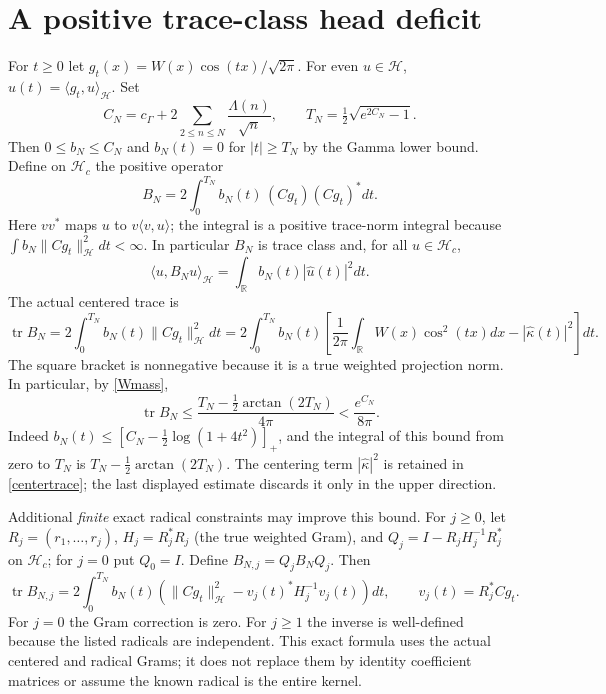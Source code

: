 \documentclass[11pt]{article}
\newcommand{\R}{\mathbb R}\newcommand{\Hh}{\mathcal H}\newcommand{\Nn}{\mathcal N}\newcommand{\norm}[1]{\lVert#1\rVert}\newcommand{\ip}[2]{\langle #1,#2\rangle}\newcommand{\dom}{\operatorname{Dom}}
\begin{document}
\section{A positive trace-class head deficit}\label{trace}
For $t\ge0$ let $g_t(x)=W(x)\cos(tx)/\sqrt{2\pi}$. For even $u\in\Hh$, $\widehat u(t)=\ip{g_t}{u}_{\Hh}$. Set
\begin{equation}\label{CN}
 C_N=c_\Gamma+2\sum_{2\le n\le N}\frac{\Lambda(n)}{\sqrt n},\qquad
 T_N=\tfrac12\sqrt{e^{2C_N}-1}.
\end{equation}
Then $0\le b_N\le C_N$ and $b_N(t)=0$ for $|t|\ge T_N$ by the Gamma lower bound. Define on $\Hh_c$ the positive operator
\begin{equation}\label{Bdef}
 B_N=2\int_0^{T_N} b_N(t)\,(Cg_t)(Cg_t)^*dt.
\end{equation}
Here $v v^*$ maps $u$ to $v\ip{v}{u}$; the integral is a positive trace-norm integral because
$\int b_N\norm{Cg_t}_{\Hh}^2dt<\infty$. In particular $B_N$ is trace class and, for all $u\in\Hh_c$,
\begin{equation}\label{Bform}
 \ip{u}{B_Nu}_{\Hh}=\int_\R b_N(t)|\widehat u(t)|^2dt.
\end{equation}
The actual centered trace is
\begin{equation}\label{centertrace}
 \operatorname{tr}B_N=2\int_0^{T_N}b_N(t)\norm{Cg_t}_{\Hh}^2dt
 =2\int_0^{T_N}b_N(t)\left[\frac1{2\pi}\int_\R W(x)\cos^2(tx)dx-|\widehat\kappa(t)|^2\right]dt.
\end{equation}
The square bracket is nonnegative because it is a true weighted projection norm. In particular, by \eqref{Wmass},
\begin{equation}\label{trbound}
 \operatorname{tr}B_N\le\frac{T_N-\tfrac12\arctan(2T_N)}{4\pi}<\frac{e^{C_N}}{8\pi}.
\end{equation}
Indeed $b_N(t)\le[C_N-\tfrac12\log(1+4t^2)]_+$, and the integral of this bound from zero to $T_N$ is $T_N-\tfrac12\arctan(2T_N)$. The centering term $|\widehat\kappa|^2$ is retained in \eqref{centertrace}; the last displayed estimate discards it only in the upper direction.

Additional \emph{finite} exact radical constraints may improve this bound. For $j\ge0$, let $R_j=(r_1,\ldots,r_j)$, $H_j=R_j^*R_j$ (the true weighted Gram), and $Q_j=I-R_jH_j^{-1}R_j^*$ on $\Hh_c$; for $j=0$ put $Q_0=I$. Define $B_{N,j}=Q_jB_NQ_j$. Then
\begin{equation}\label{radgram}
 \operatorname{tr}B_{N,j}=2\int_0^{T_N}b_N(t)\left(\norm{Cg_t}_{\Hh}^2-v_j(t)^*H_j^{-1}v_j(t)\right)dt,\qquad v_j(t)=R_j^*Cg_t.
\end{equation}
For $j=0$ the Gram correction is zero. For $j\ge1$ the inverse is well-defined because the listed radicals are independent. This exact formula uses the actual centered and radical Grams; it does not replace them by identity coefficient matrices or assume the known radical is the entire kernel.
\end{document}
